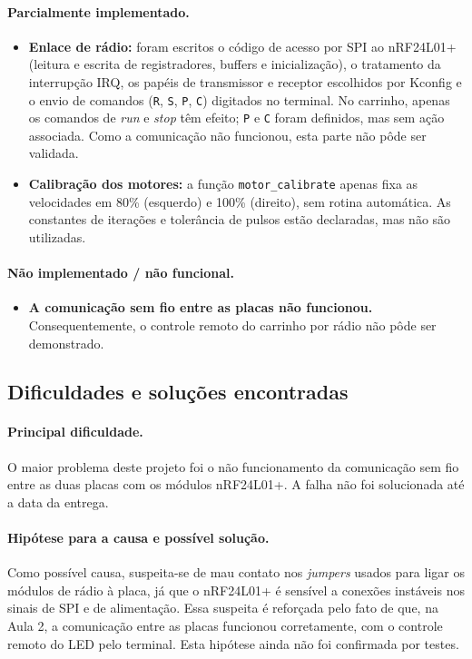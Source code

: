 \paragraph{Parcialmente implementado.}
\begin{itemize}[noitemsep]
    \item \textbf{Enlace de rádio:} foram escritos o código de acesso por SPI ao nRF24L01+ (leitura e escrita de registradores,
          buffers e inicialização), o tratamento da interrupção IRQ, os papéis de transmissor e receptor
          escolhidos por Kconfig e o envio de comandos (\texttt{R}, \texttt{S}, \texttt{P}, \texttt{C}) digitados no terminal.
          No carrinho, apenas os comandos de \textit{run} e \textit{stop} têm efeito; \texttt{P} e \texttt{C}
          foram definidos, mas sem ação associada. Como a comunicação não funcionou, esta parte não pôde ser validada.
    \item \textbf{Calibração dos motores:} a função \texttt{motor\_calibrate} apenas fixa as velocidades em 80\% (esquerdo)
          e 100\% (direito), sem rotina automática. As constantes de iterações e tolerância de pulsos estão declaradas,
          mas não são utilizadas.
\end{itemize}

\paragraph{Não implementado / não funcional.}
\begin{itemize}[noitemsep]
    \item \textbf{A comunicação sem fio entre as placas não funcionou.} Consequentemente, o controle remoto
          do carrinho por rádio não pôde ser demonstrado.
\end{itemize}

\subsection{Dificuldades e soluções encontradas}

\paragraph{Principal dificuldade.}
O maior problema deste projeto foi o não funcionamento da comunicação sem fio entre as duas placas com
os módulos nRF24L01+. A falha não foi solucionada até a data da entrega.

\paragraph{Hipótese para a causa e possível solução.}
Como possível causa, suspeita-se de mau contato nos \textit{jumpers} usados para ligar os módulos de rádio
à placa, já que o nRF24L01+ é sensível a conexões instáveis nos sinais de SPI e de alimentação.
Essa suspeita é reforçada pelo fato de que, na Aula 2, a comunicação entre as placas funcionou
corretamente, com o controle remoto do LED pelo terminal. Esta hipótese ainda não foi confirmada por testes.

